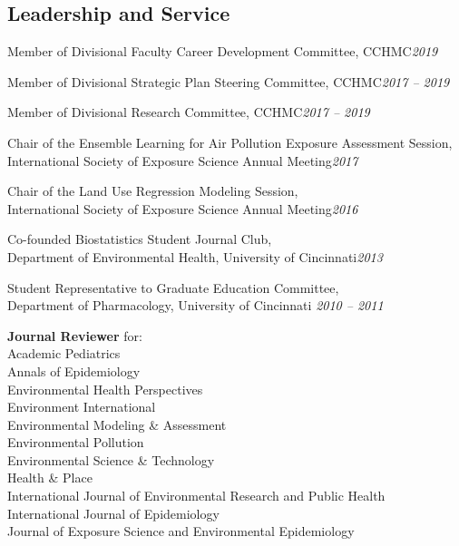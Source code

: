 \documentclass[margin,line]{res}
\newenvironment{list3}{
  \begin{list}{}{%
      \setlength{\itemsep}{0in}
      \setlength{\parsep}{0in} \setlength{\parskip}{0in}
      \setlength{\topsep}{0in} \setlength{\partopsep}{0in}
      \setlength{\leftmargin}{0in}}}{\end{list}}
\begin{document}
\begin{resume}
\section{\sc Leadership and Service}
\begin{list3} \itemsep 4pt
\item[] Member of Divisional Faculty Career Development Committee, CCHMC\hfill \textit{2019}
\item[] Member of Divisional Strategic Plan Steering Committee, CCHMC\hfill \textit{2017 -- 2019}
\item[] Member of Divisional Research Committee, CCHMC\hfill \textit{2017 -- 2019}
\item[] Chair of the Ensemble Learning for Air Pollution Exposure Assessment Session, \\International Society of Exposure Science Annual Meeting\hfill \textit{2017}
\item[] Chair of the Land Use Regression Modeling Session, \\International Society of Exposure Science Annual Meeting\hfill \textit{2016}
\item[] Co-founded Biostatistics Student Journal Club, \\Department of Environmental Health, University of Cincinnati\hfill \textit{2013}
\item[] Student Representative to Graduate Education Committee, \\Department of Pharmacology, University of Cincinnati \hfill \textit{2010 -- 2011}
\item[] \textbf{Journal Reviewer} for: \\
        Academic Pediatrics \\
        Annals of Epidemiology \\
        Environmental Health Perspectives \\
        Environment International \\
        Environmental Modeling \& Assessment \\
        Environmental Pollution \\
        Environmental Science \& Technology \\
        Health \& Place \\
        International Journal of Environmental Research and Public Health \\
        International Journal of Epidemiology \\
        Journal of Exposure Science and Environmental Epidemiology \\

\end{list3}
\end{resume}
\end{document}
